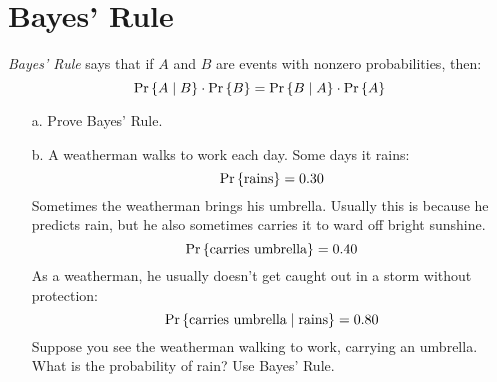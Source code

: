 \documentclass[12pt]{article}
\begin{document}


\section{Bayes' Rule} 
\textit{Bayes' Rule} says that if $A$ and $B$ are events with
nonzero probabilities, then:
%
\[
\mathop{\textup{Pr}}\nolimits\left\{A \mid B\right\} \cdot \mathop{\textup{Pr}}\nolimits\left\{B\right\} = \mathop{\textup{Pr}}\nolimits\left\{B \mid A\right\} \cdot \mathop{\textup{Pr}}\nolimits\left\{A\right\}
\]

\begin{itemize}
\item[a.] Prove Bayes' Rule.


\item[b.] A weatherman walks to work each day.  Some days it rains:
%
\[
\mathop{\textup{Pr}}\nolimits\left\{\text{rains}\right\} = 0.30
\]
%
Sometimes the weatherman brings his umbrella.  Usually this is because
he predicts rain, but he also sometimes carries it to ward off bright
sunshine.
%
\[
\mathop{\textup{Pr}}\nolimits\left\{\text{carries umbrella}\right\} = 0.40
\]
%
As a weatherman, he usually doesn't get caught out in a storm without
protection:
%
\[
\mathop{\textup{Pr}}\nolimits\left\{\text{carries umbrella} \mid \text{rains}\right\} = 0.80
\]
%
Suppose you see the weatherman walking to work, carrying an umbrella.
What is the probability of rain?  Use Bayes' Rule.


\end{itemize}
\end{document}
